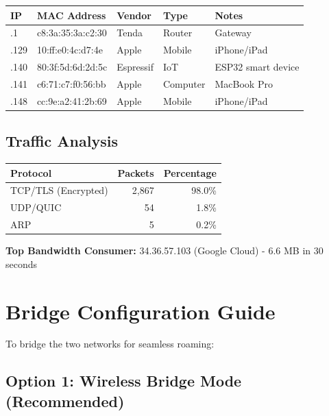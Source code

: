 \documentclass[11pt,letterpaper]{article}
\begin{document}
\begin{center}
\begin{tabular}{@{}lllll@{}}
\toprule
\textbf{IP} & \textbf{MAC Address} & \textbf{Vendor} & \textbf{Type} & \textbf{Notes} \\
\midrule
.1 & c8:3a:35:3a:c2:30 & Tenda & Router & Gateway \\
.129 & 10:ff:e0:4c:d7:4e & Apple & Mobile & iPhone/iPad \\
.140 & 80:3f:5d:6d:2d:5c & Espressif & IoT & ESP32 smart device \\
.141 & c6:71:c7:f0:56:bb & Apple & Computer & MacBook Pro \\
.148 & cc:9e:a2:41:2b:69 & Apple & Mobile & iPhone/iPad \\
\bottomrule
\end{tabular}
\end{center}

\subsection{Traffic Analysis}

\begin{center}
\begin{tabular}{lrr}
\toprule
\textbf{Protocol} & \textbf{Packets} & \textbf{Percentage} \\
\midrule
TCP/TLS (Encrypted) & 2,867 & 98.0\% \\
UDP/QUIC & 54 & 1.8\% \\
ARP & 5 & 0.2\% \\
\bottomrule
\end{tabular}
\end{center}

\textbf{Top Bandwidth Consumer:} 34.36.57.103 (Google Cloud) - 6.6 MB in 30 seconds

\section{Bridge Configuration Guide}

To bridge the two networks for seamless roaming:

\subsection{Option 1: Wireless Bridge Mode (Recommended)}
\end{document}
